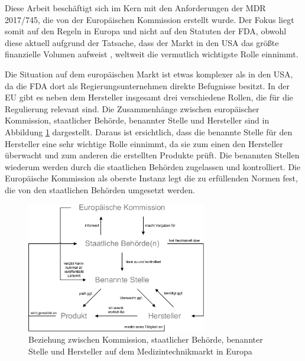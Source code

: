 \documentclass[a4paper,12pt]{report}
\begin{document}
Diese Arbeit beschäftigt sich im Kern mit den Anforderungen der \ac{MDR} 2017/745, die von der Europäischen Kommission erstellt wurde. Der Fokus liegt somit auf den Regeln in Europa und nicht auf den Statuten der FDA, obwohl diese aktuell aufgrund der Tatsache, dass der Markt in den USA das größte finanzielle Volumen aufweist \citep[vgl.][S. 8]{ITA2016}, weltweit die vermutlich wichtigste Rolle einnimmt.

Die Situation auf dem europäischen Markt ist etwas komplexer als in den USA, da die FDA dort als Regierungsunternehmen direkte Befugnisse besitzt. In der EU gibt es neben dem Hersteller insgesamt drei verschiedene Rollen, die für die Regulierung relevant sind. Die Zusammenhänge zwischen europäischer Kommission, staatlicher Behörde, benannter Stelle und Hersteller sind in Abbildung \ref{regulativ_structure_eu} dargestellt. Daraus ist ersichtlich, dass die benannte Stelle für den Hersteller eine sehr wichtige Rolle einnimmt, da sie zum einen den Hersteller überwacht und zum anderen die erstellten Produkte prüft. Die benannten Stellen wiederum werden durch die staatlichen Behörden zugelassen und kontrolliert. Die Europäische Kommission als oberste Instanz legt die zu erfüllenden Normen fest, die von den staatlichen Behörden umgesetzt werden.
\begin{figure}[ht]
\centering
\includegraphics[width=0.7\textwidth]{Images/regulativ_structure_eu}
\caption[Beziehung zwischen Kommission, staatlicher Behörde, benannter Stelle und Hersteller auf dem Medizintechnikmarkt in Europa]{Beziehung zwischen Kommission, staatlicher Behörde, benannter Stelle und Hersteller auf dem Medizintechnikmarkt in Europa \citep[S. 38]{Johner2015}}
\label{regulativ_structure_eu}
\end{figure}
\end{document}
